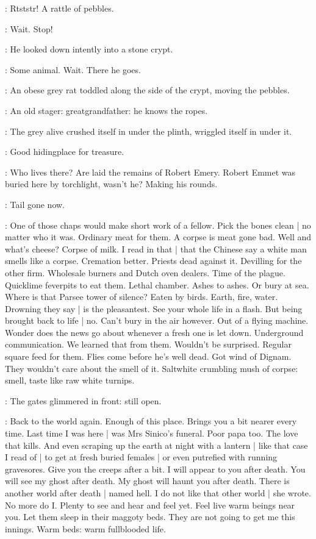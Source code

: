 :
Rtststr!
A rattle of pebbles.

\BloomInt:
Wait.
Stop!

:
He looked down intently into a stone crypt.

\BloomInt:
Some animal.
Wait.
There he goes.

:
An obese grey rat toddled along the side of the crypt, moving the pebbles.

\BloomInt:
An old stager:
greatgrandfather:
he knows the ropes.

:
The grey alive crushed itself in under the plinth,
wriggled itself in under it.

\BloomInt:
Good hidingplace for treasure.

\BloomInt:
Who lives there?
Are laid the remains of Robert Emery.
Robert Emmet was buried here by torchlight, wasn't he?
Making his rounds.

\BloomInt:
Tail gone now.

\BloomInt:
One of those chaps would make short work of a fellow.
Pick the bones clean |
no matter who it was.
Ordinary meat for them.
A corpse is meat gone bad.
Well and what's cheese?
Corpse of milk.
I read in that  |
that the Chinese say a white man smells like a corpse.
Cremation better.
Priests dead against it.
Devilling for the other firm.
Wholesale burners and Dutch oven dealers.
Time of the plague.
Quicklime feverpits to eat them.
Lethal chamber.
Ashes to ashes.
Or bury at sea.
Where is that Parsee tower of silence?
Eaten by birds.
Earth, fire, water.
Drowning they say |
is the pleasantest.
See your whole life in a flash.
But being brought back to life |
no.
Can't bury in the air however.
Out of a flying machine.
Wonder does the news go about whenever a fresh one is let down.
Underground communication.
We learned that from them.
Wouldn't be surprised.
Regular square feed for them.
Flies come before he's well dead.
Got wind of Dignam.
They wouldn't care about the smell of it.
Saltwhite crumbling mush of corpse:
smell, taste like raw white turnips.

:
The gates glimmered in front:
still open.

\BloomInt:
Back to the world again.
Enough of this place.
Brings you a bit nearer every time.
Last time I was here |
was Mrs Sinico's funeral.
Poor papa too.
The love that kills.
And even scraping up the earth at night with a lantern |
like that case I read of |
to get at fresh buried females |
or even putrefied with running gravesores.
Give you the creeps after a bit.
I will appear to you after death.
You will see my ghost after death.
My ghost will haunt you after death.
There is another world after death |
named hell.
I do not like that other world |
she wrote.
No more do I.
Plenty to see and hear and feel yet.
Feel live warm beings near you.
Let them sleep in their maggoty beds.
They are not going to get me this innings.
Warm beds:
warm fullblooded life.

